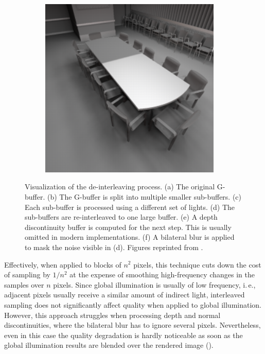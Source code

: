 \begin{figure}[htb]
\begin{subfigure}[b]{0.33\textwidth}
                     \caption{}
                     \label{fig:concept:interleaved_segovia_5}
                     \end{subfigure}%
                     \begin{subfigure}[b]{0.33\textwidth}
                         \centering
                         \includegraphics[width=0.95\textwidth]{graphics/interleaved_segovia_6}
                         \caption{}
                         \label{fig:concept:interleaved_segovia_6}
                     \end{subfigure}
                     \caption{Visualization of the de-interleaving process. (a) The original G-buffer. (b) The G-buffer is split into multiple smaller sub-buffers. (c) Each sub-buffer is processed using a different set of lights. (d) The sub-buffers are re-interleaved to one large buffer. (e) A depth discontinuity buffer is computed for the next step. This is usually omitted in modern implementations. (f) A bilateral blur is applied to mask the noise visible in (d). Figures reprinted from \citet{segovia2006non}.}
                     \label{fig:concept:interleaved_segovia}
                 \end{figure}


                 Effectively, when applied to blocks of $n^2$ pixels, this technique cuts down the cost of sampling by $ 1 / n^2 $ at the expense of smoothing high-frequency changes in the samples over $n$ pixels. Since global illumination is usually of low frequency, i.\,e., adjacent pixels usually receive a similar amount of indirect light, interleaved sampling does not significantly affect quality when applied to global illumination. However, this approach struggles when processing depth and normal discontinuities, where the bilateral blur has to ignore several pixels. Nevertheless, even in this case the quality degradation is hardly noticeable as soon as the global illumination results are blended over the rendered image ().

